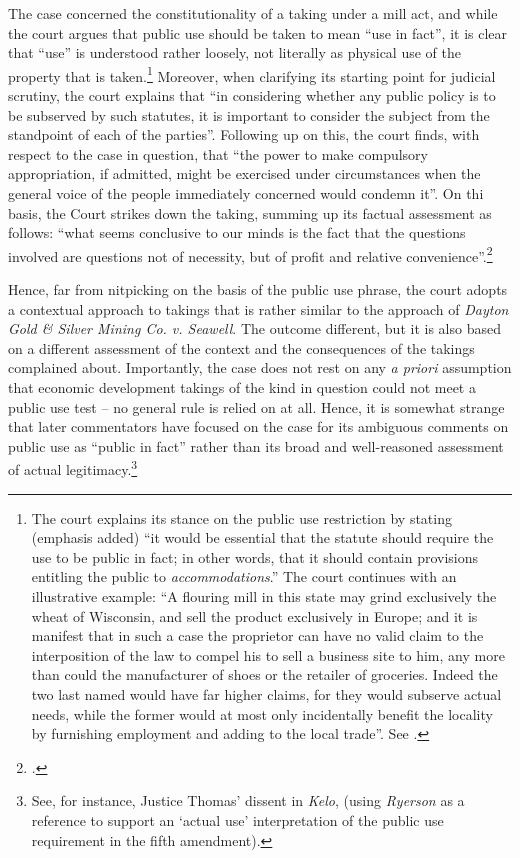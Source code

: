 {The case concerned the constitutionality of a taking under a mill act, and while the court argues that public use should be taken to mean ``use in fact'', it is clear that ``use'' is understood rather loosely, not literally as physical use of the property that is taken.\footnote{The court explains its stance on the public use restriction by stating (emphasis added) ``it would be essential that the statute should require the use to be public in fact; in other words, that it should contain provisions entitling the public to {\it accommodations}.'' The court continues with an illustrative example: ``A flouring mill in this state may grind exclusively the wheat of Wisconsin, and sell the product exclusively in Europe; and it is manifest that in such a case the proprietor can have no valid claim to the interposition of the law to compel his  to sell a business site to him, any more than could the manufacturer of shoes or the retailer of groceries. Indeed the two last named would have far higher claims, for they would subserve actual needs, while the former would at most only incidentally benefit the locality by furnishing employment and adding to the local trade''. See \cite[336]{ryerson77}.} Moreover, when clarifying its starting point for judicial scrutiny, the court explains that ``in considering whether any public policy is to be subserved by such statutes, it is important to consider the subject from the standpoint of each of the parties''. Following up on this, the court finds, with respect to the case in question, that ``the power to make compulsory appropriation, if admitted, might be exercised under circumstances when the general voice of the people immediately concerned would condemn it''. On thi basis, the Court strikes down the taking, summing up its factual assessment as follows: ``what seems conclusive to our minds is the fact that the questions involved are questions not of necessity, but of profit and relative convenience''.\footcite[336]{ryerson77}

Hence, far from nitpicking on the basis of the public use phrase, the court adopts a contextual approach to takings that is rather similar to the approach of {\it Dayton Gold \& Silver Mining Co. v. Seawell}. The outcome  different, but it is also based on a different assessment of the context and the consequences of the takings complained about. Importantly, the case does not rest on any {\it a priori} assumption that economic development takings of the kind in question could not meet a public use test -- no general rule is relied on at all. Hence, it is somewhat strange that later commentators have focused on the case for its ambiguous comments on public use as ``public in fact'' rather than its broad and well-reasoned assessment of actual legitimacy.\footnote{See, for instance, Justice Thomas' dissent in {\it Kelo}, \cite[513]{kelo05} (using {\it Ryerson} as a reference to support an `actual use' interpretation of the public use requirement in the fifth amendment).}

}

